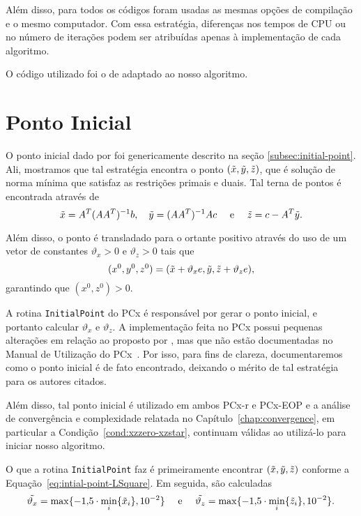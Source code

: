 Além disso, para todos os códigos foram usadas as mesmas opções de compilação e o mesmo computador. Com essa estratégia, diferenças nos tempos de CPU ou no número de iterações podem ser atribuídas apenas à implementação de cada algoritmo. 

O código utilizado foi o de \textcite{VillasBoas:2012ur,VillasBoas2013:wn} adaptado ao nosso algoritmo. 




\section{Ponto Inicial}
\label{sec:initial:point}
O ponto inicial dado por \textcite{Mehrotra:1992wr} foi genericamente descrito na seção \ref{subsec:initial-point}. Ali, mostramos que tal estratégia encontra o ponto $(\tilde{x},\tilde{y},\tilde{z})$, que é solução de norma mínima que satisfaz as restrições primais e
duais. Tal terna de pontos é encontrada através de
\begin{equation}
	\label{eq:intial-point-LSquare}
	\tilde{x} = A^T(AA^T)^{-1}b, \quad \tilde{y} = (AA^T)^{-1}Ac\quad \text{ e }
\quad \tilde{z} = c - A^T\tilde{y}.
\end{equation}

Além disso, o ponto é transladado para o ortante positivo 
através do uso de um vetor de constantes  $\vartheta_x>0$ e $\vartheta_ z>0$ tais que  
\begin{equation}
	\label{eq:intial-point-generated}
(x^0,y^0,z^0) = (\tilde{x}+ \vartheta_x e,\tilde{y},\tilde{z}+\vartheta_z e),
\end{equation}
garantindo que $(x^0,z^0)>0$.


 A rotina \verb|InitialPoint| do PCx é responsável por gerar o ponto inicial, e portanto calcular  $\vartheta_x$ e $\vartheta_ z$. A implementação feita no PCx possui  pequenas alterações em relação ao proposto por \citeauthor{Mehrotra:1992wr}, mas que não  estão documentadas no Manual de Utilização do PCx~\cite{Czyzyk:1998vw}. Por isso, para fins de clareza, documentaremos como o ponto inicial é de fato encontrado, deixando o mérito de tal estratégia para os autores citados.

  Além disso, tal ponto inicial é utilizado em ambos PCx-r e PCx-EOP e a análise de convergência e complexidade relatada no Capítulo~\ref{chap:convergence}, em particular a Condição~\ref{cond:xzzero-xzstar}, continuam válidas ao utilizá-lo para iniciar nosso algoritmo.

O que a rotina  \verb|InitialPoint| faz é primeiramente encontrar  $(\tilde{x},\tilde{y},\tilde{z})$ conforme a Equação~\eqref{eq:intial-point-LSquare}. Em seguida,  são calculadas
\begin{equation}
	\label{eq:initial-point-tilde-var}
\tilde{\vartheta_x} = \max\{\displaystyle\num{-1.5}\cdot\min_{i}\{\tilde{x}_{i}\},\num{e-2}\} \quad \text{ e }\quad  \tilde{\vartheta_z} = \max\{\displaystyle\num{-1.5}\cdot\min_{i}\{\tilde{z}_{i}\},\num{e-2}\}.
\end{equation}

